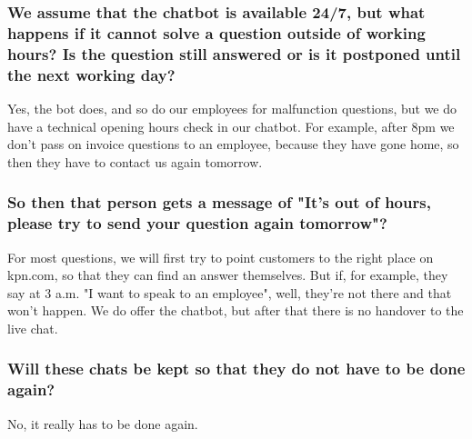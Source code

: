 \begin{appendices}
	\subsubsection{We assume that the chatbot is available 24/7, but what happens if it cannot solve a question outside of working hours? Is the question still answered or is it postponed until the next working day?}
	Yes, the bot does, and so do our employees for malfunction questions, but we do have a technical opening hours check in our chatbot. For example, after 8pm we don't pass on invoice questions to an employee, because they have gone home, so then they have to contact us again tomorrow. 
	
	\subsubsection{So then that person gets a message of "It's out of hours, please try to send your question again tomorrow"?}
	For most questions, we will first try to point customers to the right place on kpn.com, so that they can find an answer themselves. But if, for example, they say at 3 a.m. "I want to speak to an employee", well, they're not there and that won't happen. We do offer the chatbot, but after that there is no handover to the live chat. 
	
	\subsubsection{Will these chats be kept so that they do not have to be done again?}
	No, it really has to be done again.
	

\end{appendices}
